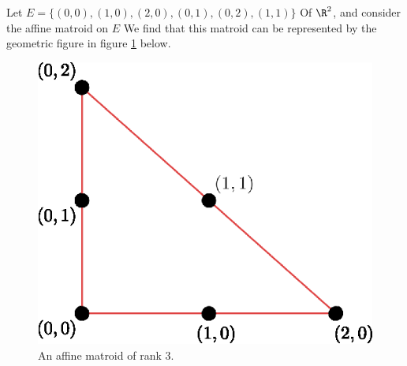 \begin{example}\label{1.17}
    Let $E=\{(0,0), (1,0), (2,0), (0,1), (0,2), (1,1)\}$ Of $\R^2$, and consider
    the affine matroid on $E$ We find that this matroid can be represented by
    the geometric figure in figure \ref{fig_1.9} below.
    \begin{figure}[h]
        \centering
        \includegraphics[scale=0.8]{Figures/Chapter1/rank_3_affine_matroid.eps}
        \caption{An affine matroid of rank $3$.}
        \label{fig_1.9}
    \end{figure}
\end{example}
